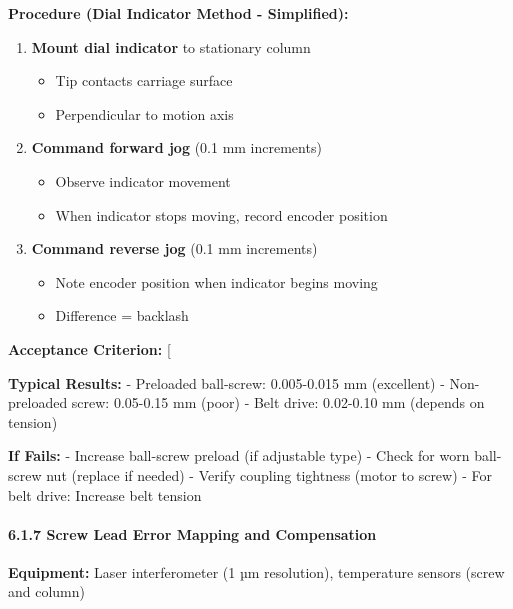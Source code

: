 \documentclass[
]{article}
\providecommand{\tightlist}{%
  \setlength{\itemsep}{0pt}\setlength{\parskip}{0pt}}
\begin{document}
\textbf{Procedure (Dial Indicator Method - Simplified):}

\begin{enumerate}
\def\labelenumi{\arabic{enumi}.}
\tightlist
\item
  \textbf{Mount dial indicator} to stationary column

  \begin{itemize}
  \tightlist
  \item
    Tip contacts carriage surface
  \item
    Perpendicular to motion axis
  \end{itemize}
\item
  \textbf{Command forward jog} (0.1 mm increments)

  \begin{itemize}
  \tightlist
  \item
    Observe indicator movement
  \item
    When indicator stops moving, record encoder position
  \end{itemize}
\item
  \textbf{Command reverse jog} (0.1 mm increments)

  \begin{itemize}
  \tightlist
  \item
    Note encoder position when indicator begins moving
  \item
    Difference = backlash
  \end{itemize}
\end{enumerate}

\textbf{Acceptance Criterion:} {[} 
\text{ mm}{]}

\textbf{Typical Results:} - Preloaded ball-screw: 0.005-0.015 mm
(excellent) - Non-preloaded screw: 0.05-0.15 mm (poor) - Belt drive:
0.02-0.10 mm (depends on tension)

\textbf{If Fails:} - Increase ball-screw preload (if adjustable type) -
Check for worn ball-screw nut (replace if needed) - Verify coupling
tightness (motor to screw) - For belt drive: Increase belt tension

\paragraph{6.1.7 Screw Lead Error Mapping and
Compensation}\label{screw-lead-error-mapping-and-compensation}

\textbf{Equipment:} Laser interferometer (1 µm resolution), temperature
sensors (screw and column)
\end{document}
